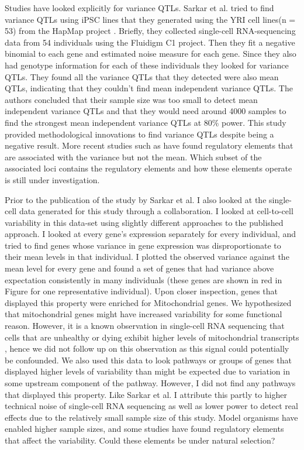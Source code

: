 Studies have looked explicitly for variance QTLs. Sarkar et al. \cite{sarkar_discovery_2018} tried to find variance QTLs using iPSC lines that they generated using the YRI cell lines(n = 53) from the HapMap project \cite{gibbs2003n}. Briefly, they collected single-cell RNA-sequencing data from 54 individuals using the Fluidigm C1 project. Then they fit a negative binomial to each gene and estimated noise measure for each gene. Since they also had genotype information for each of these individuals they looked for variance QTLs. They found all the variance QTLs that they detected were also mean QTLs, indicating that they couldn't find mean independent variance QTLs. The authors concluded that their sample size was too small to detect mean independent variance QTLs and that they would need around 4000 samples to find the strongest mean independent variance QTLs at 80\% power. This study provided methodological innovations to find variance QTLs despite being a negative result. More recent studies such as \cite{resztak2022} have found regulatory elements that are associated with the variance but not the mean. Which subset of the associated loci contains the regulatory elements and how these elements operate is still under investigation.

Prior to the publication of the study by Sarkar et al.\cite{sarkar_discovery_2018} I also looked at the single-cell data generated for this study through a collaboration. I looked at cell-to-cell variability in this data-set using slightly different approaches to the published approach. I looked at every gene's expression separately for every individual, and tried to find genes whose variance in gene expression was disproportionate to their mean levels in that individual. I plotted the observed variance against the mean level for every gene and found a set of genes that had variance above expectation consistently in many individuals (these genes are shown in red in Figure  for one representative individual). Upon closer inspection, genes that displayed this property were enriched for Mitochondrial genes. We hypothesized that mitochondrial genes might have increased variability for some functional reason. However, it is a known observation in single-cell RNA sequencing that cells that are unhealthy or dying exhibit higher levels of mitochondrial transcripts \cite {stuart2019c}, hence we did not follow up on this observation as this signal could potentially be confounded. We also used this data to look pathways or groups of genes that displayed higher levels of variability than might be expected due to variation in some upstream component of the pathway. However, I did not find any pathways that displayed this property. Like Sarkar et al. I attribute this partly to higher technical noise of single-cell RNA sequencing as well as lower power to detect real effects due to the relatively small sample size of this study. Model organisms have enabled higher sample sizes, and some studies have found regulatory elements that affect the variability. Could these elements be under natural selection?


